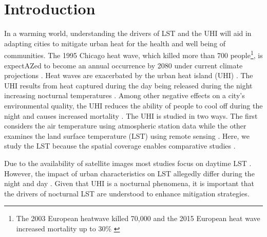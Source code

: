 \documentclass[final,3p,times,twocolumn,sort&compress]{elsarticle}
\begin{document}
\linenumbers

\section{Introduction}
In a warming world, understanding the drivers of LST and the UHI will aid in adapting cities to mitigate urban heat for the health and well being of communities.
The 1995 Chicago heat wave, which killed more than 700 people\footnote{The 2003 European heatwave killed 70,000 \cite{Robine 2008} and the 2015 European heat wave increased mortality up to 30\% \cite{Vicedo-Cabrera 2016 in Wicki} }, is expectAZed to become an annual occurrence by 2080 under current climate projections \cite{klinenberg2015heat}. 
Heat waves are exacerbated by the urban heat island (UHI) \cite{Wicki2017-fv, Echevarria_Icaza2016-fr}.
The UHI results from heat captured during the day being released during the night increasing nocturnal temperatures \cite{Oke 1987, Landsberg1981, Rotach2005(bubble)}.
Among other negative effects on a city's environmental quality, the UHI reduces the ability of people to cool off during the night and causes increased mortality \cite{Stone2006}.
The UHI is studied in two ways.
The first considers the air temperature using atmospheric station data \cite{Scott2016-lc, etc} while the other examines the land surface temperature (LST) using remote sensing \cite{imhoff, Peng2012-iy, Peng2018-cp, Zhou2014-wc, etc.}. 
Here, we study the LST because the spatial coverage enables comparative studies \cite{Hung2006-qy}.

Due to the availability of satellite images most studies focus on daytime LST \cite{examples looking at day LST}.
However, the impact of urban characteristics on LST allegedly differ during the night and day \cite{Hung2006-qy, Chun2017-mm, Nichol2005-mm, Wicki2017-fv, Echevarria_Icaza2016-fr,Sobstyl2018-wt, Peng2012-iy, Zhou2014-wc, Zhao2017-cc}. 
Given that UHI is a nocturnal phenomena, it is important that the drivers of nocturnal LST are understood to enhance mitigation strategies. 
\end{document}
